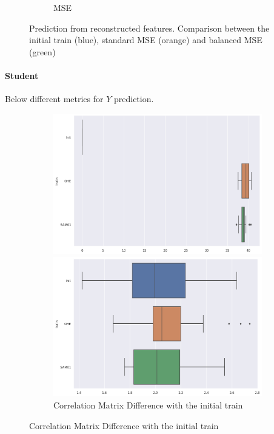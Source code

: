 \documentclass{article}
\theoremstyle{definition}
\begin{document}
\begin{figure}[H]
\begin{subfigure}[b]{0.49\textwidth}
         \caption{MSE}
     \end{subfigure}
     \caption{Prediction from reconstructed features. Comparison between the initial train (blue), standard MSE (orange) and balanced MSE (green)}
\end{figure}






\newpage
\paragraph{Student}Below different metrics for $Y$ prediction.
\begin{figure}[H]
     \centering
     \begin{subfigure}[b]{0.49\textwidth}
         \centering
         \includegraphics[width=\textwidth]{imgs/Student/boxplot_MC.png}
         \caption{Correlation Matrix Difference with the initial train}
         \quad
         \includegraphics[width=\textwidth]{imgs/Student/boxplot_MAE.png}

\end{subfigure}
\end{figure}
\end{document}
